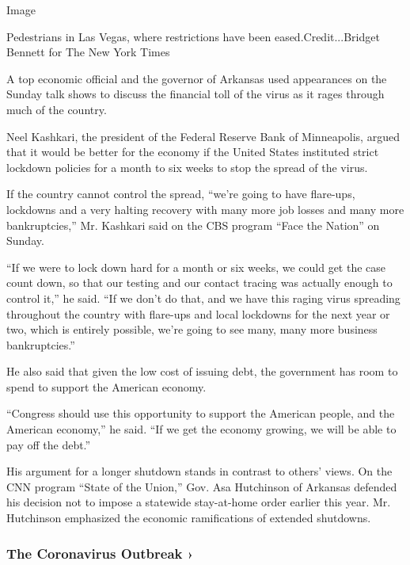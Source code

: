 Image

Pedestrians in Las Vegas, where restrictions have been
eased.Credit...Bridget Bennett for The New York Times

A top economic official and the governor of Arkansas used appearances on
the Sunday talk shows to discuss the financial toll of the virus as it
rages through much of the country.

Neel Kashkari, the president of the Federal Reserve Bank of Minneapolis,
argued that it would be better for the economy if the United States
instituted strict lockdown policies for a month to six weeks to stop the
spread of the virus.

If the country cannot control the spread, ``we're going to have
flare-ups, lockdowns and a very halting recovery with many more job
losses and many more bankruptcies,'' Mr. Kashkari said on the CBS
program ``Face the Nation'' on Sunday.

``If we were to lock down hard for a month or six weeks, we could get
the case count down, so that our testing and our contact tracing was
actually enough to control it,'' he said. ``If we don't do that, and we
have this raging virus spreading throughout the country with flare-ups
and local lockdowns for the next year or two, which is entirely
possible, we're going to see many, many more business bankruptcies.''

He also said that given the low cost of issuing debt, the government has
room to spend to support the American economy.

``Congress should use this opportunity to support the American people,
and the American economy,'' he said. ``If we get the economy growing, we
will be able to pay off the debt.''

His argument for a longer shutdown stands in contrast to others' views.
On the CNN program ``State of the Union,'' Gov. Asa Hutchinson of
Arkansas defended his decision not to impose a statewide stay-at-home
order earlier this year. Mr. Hutchinson emphasized the economic
ramifications of extended shutdowns.

\href{https://www.nytimes3xbfgragh.onion/news-event/coronavirus?action=click\&pgtype=Article\&state=default\&region=MAIN_CONTENT_3\&context=storylines_faq}{}

\hypertarget{the-coronavirus-outbreak-}{%
\subsubsection{The Coronavirus Outbreak
›}\label{the-coronavirus-outbreak-}}

